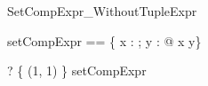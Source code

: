 \begin{zsection}
  \SECTION SetCompExpr\_WithoutTupleExpr
\end{zsection}

\begin{zed}
  setCompExpr == \{ x : \power \nat; y : \power \nat @ x \cross y\}
\end{zed}

\begin{zed}
  \vdash? \{ (1, 1) \} \in setCompExpr
\end{zed}
